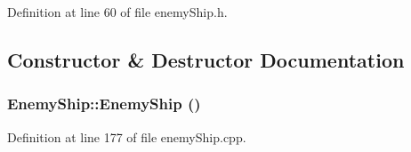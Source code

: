 Definition at line 60 of file enemyShip.h.

\subsection{Constructor \& Destructor Documentation}
\hypertarget{class_enemy_ship_a786aafea29d674b7b3453a2a24f1d11c}{
\subsubsection[{EnemyShip}]{\setlength{\rightskip}{0pt plus 5cm}EnemyShip::EnemyShip ()}}
\label{class_enemy_ship_a786aafea29d674b7b3453a2a24f1d11c}


Definition at line 177 of file enemyShip.cpp.


